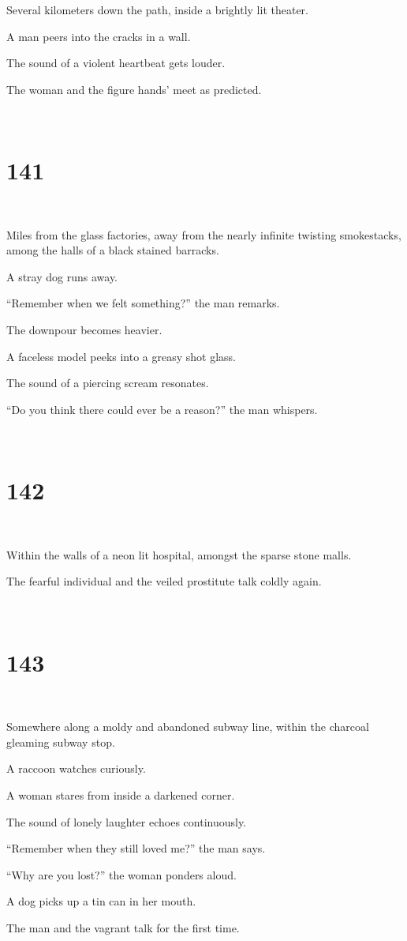 \documentclass{report}
\begin{document}
Several kilometers down the path, inside a brightly lit theater.

A man peers into the cracks in a wall.

The sound of a violent heartbeat gets louder.

The woman and the figure hands' meet as predicted.

~
\chapter*{141}
~

Miles from the glass factories, away from the nearly infinite twisting smokestacks, among the halls of a black stained barracks.

A stray dog runs away.

``Remember when we felt something?'' the man remarks.

The downpour becomes heavier.

A faceless model peeks into a greasy shot glass.

The sound of a piercing scream resonates.

``Do you think there could ever be a reason?'' the man whispers.

~
\chapter*{142}
~

Within the walls of a neon lit hospital, amongst the sparse stone malls.

The fearful individual and the veiled prostitute talk coldly again.

~
\chapter*{143}
~

Somewhere along a moldy and abandoned subway line, within the charcoal gleaming subway stop.

A raccoon watches curiously.

A woman stares from inside a darkened corner.

The sound of lonely laughter echoes continuously.

``Remember when they still loved me?'' the man says.

``Why are you lost?'' the woman ponders aloud.

A dog picks up a tin can in her mouth.

The man and the vagrant talk for the first time.
\end{document}
